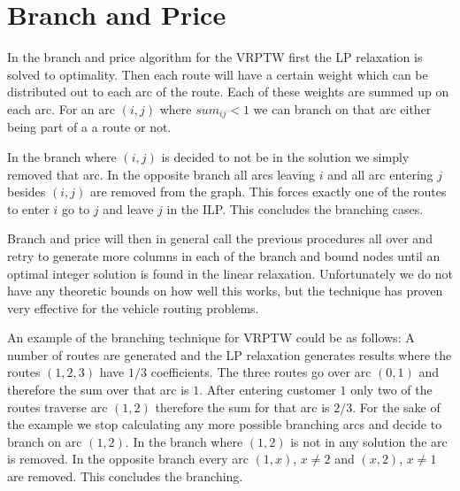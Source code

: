 \section{Branch and Price}
In the branch and price algorithm for the VRPTW first the LP relaxation is solved to optimality. Then each route will have a certain weight which can be distributed out to each arc of the route. Each of these weights are summed up on each arc. For an arc $(i,j)$ where $sum_{ij} < 1$ we can branch on that arc either being part of a a route or not. 

In the branch where $(i,j)$ is decided to not be in the solution we simply removed that arc. In the opposite branch all arcs leaving $i$ and all arc entering $j$ besides $(i,j)$ are removed from the graph. This forces exactly one of the routes to enter $i$ go to $j$ and leave $j$ in the ILP. This concludes the branching cases.

Branch and price will then in general call the previous procedures all over and retry to generate more columns in each of the branch and bound nodes until an optimal integer solution is found in the linear relaxation. Unfortunately we do not have any theoretic bounds on how well this works, but the technique has proven very effective for the vehicle routing problems.

\newpar An example of the branching technique for VRPTW could be as follows: A number of routes are generated and the LP relaxation generates results where the routes $(1,2,3)$ have $1/3$ coefficients. The three routes go over arc $(0,1)$ and therefore the sum over that arc is $1$. After entering customer $1$ only two of the routes traverse arc $(1,2)$ therefore the sum for that arc is $2/3$. For the sake of the example we stop calculating any more possible branching arcs and decide to branch on arc $(1,2)$. In the branch where $(1,2)$ is not in any solution the arc is removed. In the opposite branch every arc $(1, x)$, $x\neq 2$ and $(x,2)$, $x\neq 1$ are removed. This concludes the branching.
